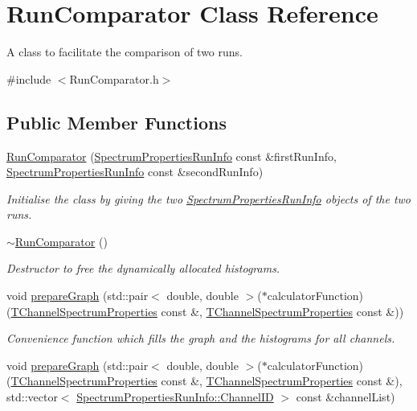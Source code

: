 \hypertarget{class_run_comparator}{\section{Run\-Comparator Class Reference}
\label{class_run_comparator}
}


A class to facilitate the comparison of two runs.  




{\ttfamily \#include $<$Run\-Comparator.\-h$>$}

\subsection*{Public Member Functions}
\begin{DoxyCompactItemize}
\item 
\hyperlink{class_run_comparator_ad66bf8c2b9402ed2f00f69afcc6e8bd6}{Run\-Comparator} (\hyperlink{class_spectrum_properties_run_info}{Spectrum\-Properties\-Run\-Info} const \&first\-Run\-Info, \hyperlink{class_spectrum_properties_run_info}{Spectrum\-Properties\-Run\-Info} const \&second\-Run\-Info)
\begin{DoxyCompactList}\small\item\em Initialise the class by giving the two \hyperlink{class_spectrum_properties_run_info}{Spectrum\-Properties\-Run\-Info} objects of the two runs. \end{DoxyCompactList}\item 
\hyperlink{class_run_comparator_a6df76f47b1cd9e6da5615814f3f631c5}{$\sim$\-Run\-Comparator} ()
\begin{DoxyCompactList}\small\item\em Destructor to free the dynamically allocated histograms. \end{DoxyCompactList}\item 
void \hyperlink{class_run_comparator_a31b28d33c185a2be5a17c42525dd2ec0}{prepare\-Graph} (std\-::pair$<$ double, double $>$($\ast$calculator\-Function)(\hyperlink{class_t_channel_spectrum_properties}{T\-Channel\-Spectrum\-Properties} const \&, \hyperlink{class_t_channel_spectrum_properties}{T\-Channel\-Spectrum\-Properties} const \&))
\begin{DoxyCompactList}\small\item\em Convenience function which fills the graph and the histograms for all channels. \end{DoxyCompactList}\item 
void \hyperlink{class_run_comparator_a23682ec1792eea496942f83d8b9a36e8}{prepare\-Graph} (std\-::pair$<$ double, double $>$($\ast$calculator\-Function)(\hyperlink{class_t_channel_spectrum_properties}{T\-Channel\-Spectrum\-Properties} const \&, \hyperlink{class_t_channel_spectrum_properties}{T\-Channel\-Spectrum\-Properties} const \&), std\-::vector$<$ \hyperlink{class_spectrum_properties_run_info_1_1_channel_i_d}{Spectrum\-Properties\-Run\-Info\-::\-Channel\-I\-D} $>$ const \&channel\-List)

\end{DoxyCompactItemize}
